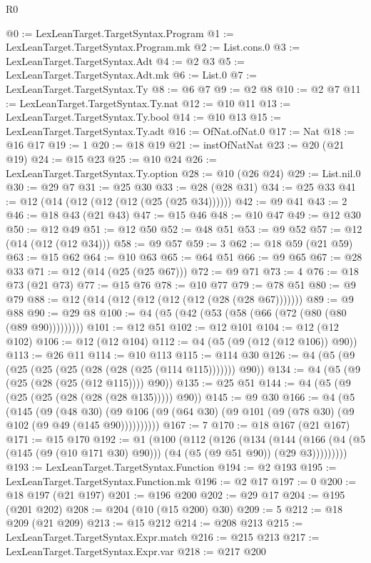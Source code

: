 \begin{lexlean}{R0}
\begin{coremodule}
@0 := LexLeanTarget.TargetSyntax.Program
@1 := LexLeanTarget.TargetSyntax.Program.mk
@2 := List.cons.{0}
@3 := LexLeanTarget.TargetSyntax.Adt
@4 := @2 @3
@5 := LexLeanTarget.TargetSyntax.Adt.mk
@6 := List.{0}
@7 := LexLeanTarget.TargetSyntax.Ty
@8 := @6 @7
@9 := @2 @8
@10 := @2 @7
@11 := LexLeanTarget.TargetSyntax.Ty.nat
@12 := @10 @11
@13 := LexLeanTarget.TargetSyntax.Ty.bool
@14 := @10 @13
@15 := LexLeanTarget.TargetSyntax.Ty.adt
@16 := OfNat.ofNat.{0}
@17 := Nat
@18 := @16 @17
@19 := 1
@20 := @18 @19
@21 := instOfNatNat
@23 := @20 (@21 @19)
@24 := @15 @23
@25 := @10 @24
@26 := LexLeanTarget.TargetSyntax.Ty.option
@28 := @10 (@26 @24)
@29 := List.nil.{0}
@30 := @29 @7
@31 := @25 @30
@33 := @28 (@28 @31)
@34 := @25 @33
@41 := @12 (@14 (@12 (@12 (@12 (@25 (@25 @34))))))
@42 := @9 @41
@43 := 2
@46 := @18 @43 (@21 @43)
@47 := @15 @46
@48 := @10 @47
@49 := @12 @30
@50 := @12 @49
@51 := @12 @50
@52 := @48 @51
@53 := @9 @52
@57 := @12 (@14 (@12 (@12 @34)))
@58 := @9 @57
@59 := 3
@62 := @18 @59 (@21 @59)
@63 := @15 @62
@64 := @10 @63
@65 := @64 @51
@66 := @9 @65
@67 := @28 @33
@71 := @12 (@14 (@25 (@25 @67)))
@72 := @9 @71
@73 := 4
@76 := @18 @73 (@21 @73)
@77 := @15 @76
@78 := @10 @77
@79 := @78 @51
@80 := @9 @79
@88 := @12 (@14 (@12 (@12 (@12 (@12 (@28 (@28 @67)))))))
@89 := @9 @88
@90 := @29 @8
@100 := @4 (@5 (@42 (@53 (@58 (@66 (@72 (@80 (@80 (@89 @90)))))))))
@101 := @12 @51
@102 := @12 @101
@104 := @12 (@12 @102)
@106 := @12 (@12 @104)
@112 := @4 (@5 (@9 (@12 (@12 @106)) @90))
@113 := @26 @11
@114 := @10 @113
@115 := @114 @30
@126 := @4 (@5 (@9 (@25 (@25 (@25 (@28 (@28 (@25 (@114 @115))))))) @90))
@134 := @4 (@5 (@9 (@25 (@28 (@25 (@12 @115)))) @90))
@135 := @25 @51
@144 := @4 (@5 (@9 (@25 (@25 (@28 (@28 (@28 @135))))) @90))
@145 := @9 @30
@166 := @4
    (@5
      (@145
        (@9
          (@48 @30)
          (@9 @106 (@9 (@64 @30) (@9 @101 (@9 (@78 @30) (@9 @102 (@9 @49 (@145 @90))))))))))
@167 := 7
@170 := @18 @167 (@21 @167)
@171 := @15 @170
@192 := @1
    (@100
      (@112
        (@126
          (@134
            (@144
              (@166 (@4 (@5 (@145 (@9 (@10 @171 @30) @90))) (@4 (@5 (@9 @51 @90)) (@29 @3)))))))))
@193 := LexLeanTarget.TargetSyntax.Function
@194 := @2 @193
@195 := LexLeanTarget.TargetSyntax.Function.mk
@196 := @2 @17
@197 := 0
@200 := @18 @197 (@21 @197)
@201 := @196 @200
@202 := @29 @17
@204 := @195 (@201 @202)
@208 := @204 (@10 (@15 @200) @30)
@209 := 5
@212 := @18 @209 (@21 @209)
@213 := @15 @212
@214 := @208 @213
@215 := LexLeanTarget.TargetSyntax.Expr.match
@216 := @215 @213
@217 := LexLeanTarget.TargetSyntax.Expr.var
@218 := @217 @200

\end{coremodule}
\end{lexlean}
